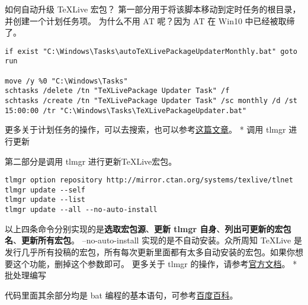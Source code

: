 \begin{faq}{如何自动升级 TeXLive 宏包？}
第一部分用于将该脚本移动到定时任务的根目录，并创建一个计划任务项。
为什么不用 AT 呢？因为 AT 在 Win10 中已经被取缔了。

\begin{verbatim}
if exist "C:\Windows\Tasks\autoTeXLivePackageUpdaterMonthly.bat" goto run

move /y %0 "C:\Windows\Tasks"
schtasks /delete /tn "TeXLivePackage Updater Task" /f
schtasks /create /tn "TeXLivePackage Updater Task" /sc monthly /d /st 15:00:00 /tr "C:\Windows\Tasks\TeXLivePackageUpdater.bat"
\end{verbatim}

更多关于计划任务的操作，可以去搜索，也可以参考\href{https://www.flighty.cn/html/tutorial/20170406_442.html}{这篇文章}。
* 调用 tlmgr 进行更新

第二部分是调用 tlmgr 进行更新TeXLive宏包。

\begin{verbatim}
tlmgr option repository http://mirror.ctan.org/systems/texlive/tlnet
tlmgr update --self
tlmgr update --list
tlmgr update --all --no-auto-install
\end{verbatim}

以上四条命令分别实现的是\textbf{选取宏包源}、\textbf{更新 tlmgr
自身}、\textbf{列出可更新的宏包名}、\textbf{更新所有宏包}。
--no-auto-install 实现的是不自动安装。众所周知 TeXLive
是发行几乎所有投稿的宏包，所有每次更新里面都有太多自动安装的宏包。如果你想要这个功能，删掉这个参数即可。
更多关于 tlmgr
的操作，请参考\href{https://www.tug.org/texlive/doc/tlmgr.html}{官方文档}。
* 批处理编写

代码里面其余部分均是 bat
编程的基本语句，可参考\href{https://baike.baidu.com/item/\%E6\%89\%B9\%E5\%A4\%84\%E7\%90\%86/1448600?fr=aladdin}{百度百科}。
\end{faq}


